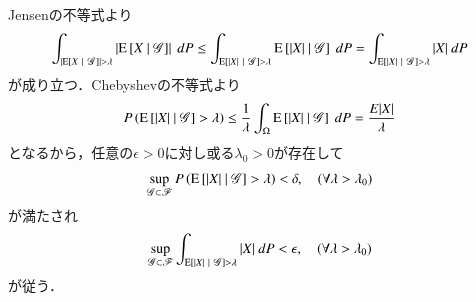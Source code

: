 	\begin{prf}
		Jensenの不等式より
		\begin{align}
			\int_{\left| \operatorname{E} \left[ X \ \middle|\ \mathscr{G} \right] \right| > \lambda} \left| \operatorname{E} \left[ X \ \middle|\ \mathscr{G} \right] \right|\ dP
			\leq \int_{\operatorname{E} \left[ |X| \ \middle|\ \mathscr{G} \right] > \lambda} \operatorname{E} \left[ |X| \ \middle|\ \mathscr{G} \right]\ dP
			= \int_{\operatorname{E} \left[ |X| \ \middle|\ \mathscr{G} \right] > \lambda} |X|\ dP
		\end{align}
		が成り立つ．Chebyshevの不等式より
		\begin{align}
			P\left( \cexp{|X|}{\mathscr{G}} > \lambda \right)
			\leq \frac{1}{\lambda} \int_\Omega \cexp{|X|}{\mathscr{G}}\ dP
			= \frac{E|X|}{\lambda}
		\end{align}
		となるから，任意の$\epsilon > 0$に対し或る$\lambda_0 > 0$が存在して
		\begin{align}
			\operatorname*{sup}_{\mathscr{G} \subset \mathscr{F}} P\left( \operatorname{E} \left[ |X| \ \middle|\ \mathscr{G} \right] > \lambda \right)
			< \delta,
			\quad (\forall \lambda > \lambda_0)
		\end{align}
		が満たされ
		\begin{align}
			\operatorname*{sup}_{\mathscr{G} \subset \mathscr{F}} \int_{\operatorname{E} \left[ |X| \ \middle|\ \mathscr{G} \right] > \lambda}|X|\ dP
			< \epsilon,
			\quad (\forall \lambda > \lambda_0)
		\end{align}
		が従う．
		\QED
	\end{prf}
